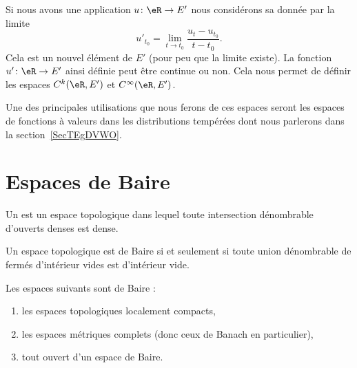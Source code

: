 \begin{definition}  \label{DefDZsypWu}
	Si nous avons une application \( u\colon \eR\to E'\) nous considérons sa  donnée par la limite
	\begin{equation}
		u'_{t_0}=\lim_{t\to t_0} \frac{ u_t-u_{t_0} }{ t-t_0 }.
	\end{equation}
	Cela est un nouvel élément de \( E'\) (pour peu que la limite existe). La fonction \( u'\colon \eR\to E'\) ainsi définie peut être continue ou non. Cela nous permet de définir les espaces \( C^k(\eR,E')\) et \( C^{\infty}(\eR,E')\).
\end{definition}
Une des principales utilisations que nous ferons de ces espaces seront les espaces de fonctions à valeurs dans les distributions tempérées dont nous parlerons dans la section~\ref{SecTEgDVWO}.

\section{Espaces de Baire}
\label{SecBDlaUrz}

\begin{definition}      \label{DEFooYEMNooLSXLYa}
	Un  est un espace topologique dans lequel toute intersection dénombrable d'ouverts denses est dense.
\end{definition}

\begin{lemma}       \label{LEMooTOJDooQDtWUC}
	Un espace topologique est de Baire si et seulement si toute union dénombrable de fermés d'intérieur vides est d'intérieur vide.
\end{lemma}

\begin{theorem}    \label{ThoBBIljNM}
	Les espaces suivants sont de Baire :
	\begin{enumerate}
		\item
		      les espaces topologiques localement compacts,
		\item
		      les espaces métriques complets (donc ceux de Banach en particulier),
		\item
		      tout ouvert d'un espace de Baire.
	\end{enumerate}
\end{theorem}

